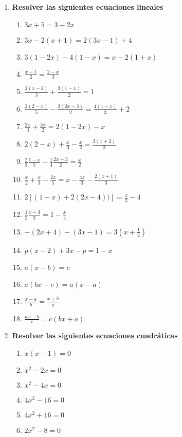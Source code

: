 \documentclass[a4paper,12pt]{article}
\begin{document}
\begin{enumerate}
  \item {\bf{Resolver las siguientes ecuaciones lineales}} %
    \begin{enumerate}
      \item $3x + 5 = 3 - 2x$
      \item $3x - 2(x + 1) = 2(3x - 1) + 4$
      \item $3(1 - 2x) - 4(1 - x) = x - 2(1 + x)$
      \item $\frac{x-1}{2} = \frac{2-x}{3}$
      \item $\frac{2(x-2)}{3} + \frac{3(1-x)}{2} = 1$
      \item $\frac{2(2-x)}{5} - \frac{3(2x-3)}{2} = \frac{4(1-x)}{3} + 2$
      \item $\frac{2x}{3} + \frac{3x}{2} = 2 (1 - 2x) - x$
      \item $2(2-x) + \frac{x}{3} - \frac{x}{2} = \frac{3(x+2)}{2}$
      \item $\frac23 \frac{1-x}{5} - \frac14 \frac{2x+3}{2}=\frac{x}{2}$
      \item $\frac{x}{2} + \frac{x}{3} - \frac{2x}{5} = x - \frac{4x}{3} - \frac{2(x+1)}{3}$
      \item $2 \left [ (1 - x) + 2 (2x - 4)) \right ] = \frac{x}{2} - 4$
      \item $\frac12 \frac{x-3}{3} = 1 - \frac{x}{4}$
      \item $- (2x + 4) - (3x - 1) = 3(x + \frac14 )$
      \item $p(x - 2) + 3x - p = 1 - x$
      \item $a(x - b) = c$
      \item $a(bx - c) = a(x - a)$
      \item $\frac{x-a}{b}=\frac{x+b}{a}$
      \item $\frac{ax-b}{c} = c (bx+a)$
    \end{enumerate}
  \item {\bf{Resolver las siguientes ecuaciones cuadráticas}} %
    \begin{enumerate}
      \item $x(x-1)=0$
      \item $x^2-2x=0$
      \item $x^2 - 4x = 0$
      \item $4x^2 - 16 = 0$
      \item $4x^2 + 16 = 0$
      \item $2x^2 - 8 = 0$

\end{enumerate}
\end{enumerate}
\end{document}
